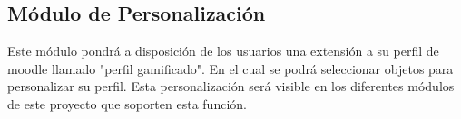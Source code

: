 \subsection*{Módulo de Personalización}

 \noindent 
 Este módulo pondrá a disposición de los usuarios una extensión a su perfil de moodle llamado "perfil gamificado". En el cual se podrá
 seleccionar objetos para personalizar su perfil. Esta personalización será visible en los diferentes módulos de este proyecto que soporten
 esta función.










  


